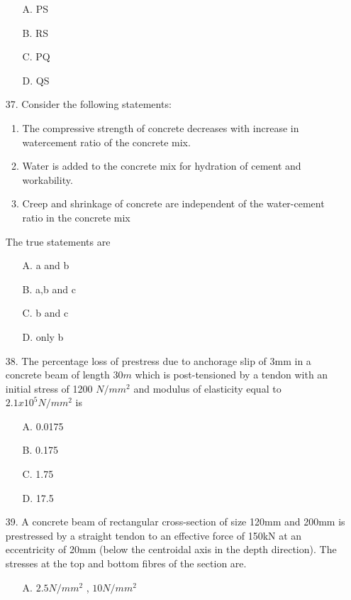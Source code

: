 \documentclass[journal]{IEEEtran}
\begin{document}
\begin{enumerate}
    \begin{enumerate}
        \item [A.] PS
        \item [B.] RS
        \item [C.] PQ
        \item [D.] QS
    \end{enumerate}
  \item[37.]  Consider the following statements: 
  \begin{enumerate}
    \item The compressive strength of concrete decreases with increase in watercement ratio of the concrete mix.
    \item Water is added to the concrete mix for hydration of cement and
    workability. 
    \item Creep and shrinkage of concrete are independent of the water-cement ratio
    in the concrete mix
  \end{enumerate}
  The true statements are 
  \begin{enumerate}
    \item [A.] a and b
    \item [B.] a,b and c
    \item [C.] b and c
    \item [D.] only b
  \end{enumerate}
  \item [38.] The percentage loss of prestress due to anchorage slip of 3mm in a concrete beam
  of length $30m$ which is post-tensioned by a tendon with an initial stress of 1200 $N/mm^2$
  and modulus of elasticity equal to $2.1 x 10^5N/mm^2$ is
  \begin{enumerate}
    \item [A.] 0.0175 
    \item [B.] 0.175 
    \item [C.] 1.75 
    \item [D.] 17.5 
  \end{enumerate}
  \item [39.] A concrete beam of rectangular cross-section of size 120mm  and 200mm
   is prestressed by a straight tendon to an effective force of 150kN at an
  eccentricity of 20mm (below the centroidal axis in the depth direction). The
  stresses at the top and bottom fibres of the section are.
  \begin{enumerate}
    \item [A.] $2.5N/mm^2$ , $10N/mm^2$ 

\end{enumerate}
\end{enumerate}
\end{document}
